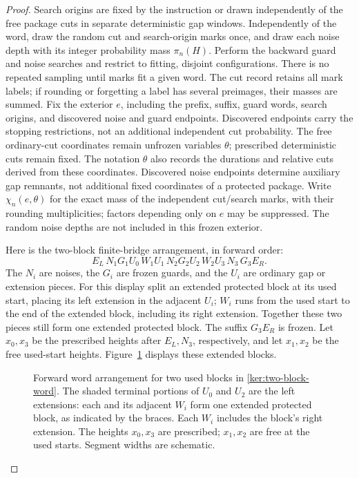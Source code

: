 \begin{proof}
Search origins are fixed by the instruction or drawn independently
of the free package cuts in separate deterministic gap windows.
Independently of the word, draw the random cut and search-origin marks once,
and draw each noise depth with its integer probability mass
\(\pi_n(H)\).  Perform the backward guard and noise searches and
restrict to fitting, disjoint configurations.  There is no repeated
sampling until marks fit a given word.  The cut record retains all
mark labels; if rounding or forgetting a label has several preimages,
their masses are summed.  Fix the exterior \(e\), including the
prefix, suffix, guard words, search origins, and discovered noise and
guard endpoints.  Discovered endpoints carry the stopping restrictions,
not an additional independent cut probability. The free ordinary-cut
coordinates remain unfrozen variables \(\theta\); prescribed
deterministic cuts remain fixed. The notation \(\theta\) also records
the durations and relative cuts derived from these coordinates.
Discovered noise endpoints determine auxiliary gap remnants, not
additional fixed coordinates of a protected package.
Write \(\chi_n(e,\theta)\) for the exact mass of the independent
cut/search marks, with their rounding multiplicities; factors depending
only on \(e\) may be suppressed.  The random noise depths are not
included in this frozen exterior.

Here is the two-block finite-bridge arrangement, in forward order:
\begin{equation}\label{ker:two-block-word}
 E_L\,N_1G_1U_0\,W_1U_1\,N_2G_2U_2\,W_2U_3\,N_3\,G_3E_R.
\end{equation}
The \(N_i\) are noises, the \(G_i\) are frozen guards, and the
\(U_i\) are ordinary gap or extension pieces.  For this display split
an extended protected block at its used start, placing its left
extension in the adjacent \(U_i\); \(W_i\) runs from the used start
to the end of the extended block, including its right extension.
Together these two pieces still form one extended protected block.
The suffix \(G_3E_R\) is frozen.
Let \(x_0,x_3\) be the prescribed heights after \(E_L,N_3\),
respectively, and let \(x_1,x_2\) be the free used-start heights.
Figure~\ref{ker:word-arrangement-figure} displays these extended blocks.

\begin{figure}[htbp]
\centering

\caption{Forward word arrangement for two used blocks in
\eqref{ker:two-block-word}.  The shaded terminal portions of \(U_0\)
and \(U_2\) are the left extensions: each and its adjacent \(W_i\)
form one extended protected block, as indicated by the braces.
Each \(W_i\) includes the block's right extension.
The heights \(x_0,x_3\) are prescribed; \(x_1,x_2\) are free at the
used starts.  Segment widths are schematic.}
\label{ker:word-arrangement-figure}
\end{figure}


\end{proof}
